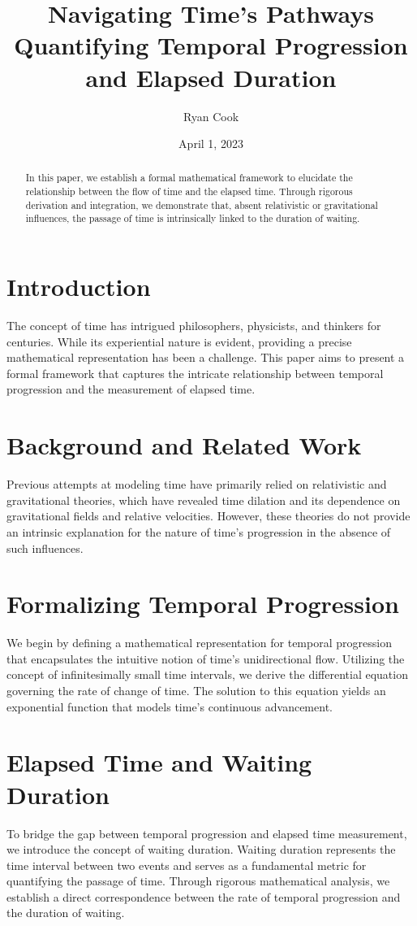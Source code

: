 \documentclass{article}
\title{Navigating Time's Pathways \\[1ex] \large Quantifying Temporal Progression and Elapsed Duration}
\author{Ryan Cook}
\date{April 1, 2023}
\begin{document}
\maketitle

\begin{abstract}
    In this paper, we establish a formal mathematical framework to elucidate the relationship between the flow of time and the elapsed time. Through rigorous derivation and integration, we demonstrate that, absent relativistic or gravitational influences, the passage of time is intrinsically linked to the duration of waiting.
\end{abstract}

\section{Introduction}
The concept of time has intrigued philosophers, physicists, and thinkers for centuries. While its experiential nature is evident, providing a precise mathematical representation has been a challenge. This paper aims to present a formal framework that captures the intricate relationship between temporal progression and the measurement of elapsed time.

\section{Background and Related Work}
Previous attempts at modeling time have primarily relied on relativistic and gravitational theories, which have revealed time dilation and its dependence on gravitational fields and relative velocities. However, these theories do not provide an intrinsic explanation for the nature of time's progression in the absence of such influences.

\section{Formalizing Temporal Progression}
We begin by defining a mathematical representation for temporal progression that encapsulates the intuitive notion of time's unidirectional flow. Utilizing the concept of infinitesimally small time intervals, we derive the differential equation governing the rate of change of time. The solution to this equation yields an exponential function that models time's continuous advancement.

\section{Elapsed Time and Waiting Duration}
To bridge the gap between temporal progression and elapsed time measurement, we introduce the concept of waiting duration. Waiting duration represents the time interval between two events and serves as a fundamental metric for quantifying the passage of time. Through rigorous mathematical analysis, we establish a direct correspondence between the rate of temporal progression and the duration of waiting.
\end{document}
